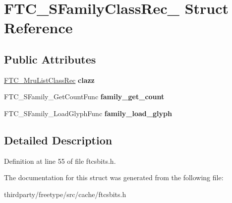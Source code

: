 \hypertarget{struct_f_t_c___s_family_class_rec__}{}\section{F\+T\+C\+\_\+\+S\+Family\+Class\+Rec\+\_\+ Struct Reference}
\label{struct_f_t_c___s_family_class_rec__}
\subsection*{Public Attributes}
\begin{DoxyCompactItemize}
\item 
\mbox{\label{struct_f_t_c___s_family_class_rec___af7d295d715e5f9f3b547be44f0e3f90b}} 
\hyperlink{struct_f_t_c___mru_list_class_rec__}{F\+T\+C\+\_\+\+Mru\+List\+Class\+Rec} {\bfseries clazz}
\item 
\mbox{\label{struct_f_t_c___s_family_class_rec___a57fc1e09cc711845085cb92c1d501906}} 
F\+T\+C\+\_\+\+S\+Family\+\_\+\+Get\+Count\+Func {\bfseries family\+\_\+get\+\_\+count}
\item 
\mbox{\label{struct_f_t_c___s_family_class_rec___a98a017fde579be6a9cbf27c8e1febf34}} 
F\+T\+C\+\_\+\+S\+Family\+\_\+\+Load\+Glyph\+Func {\bfseries family\+\_\+load\+\_\+glyph}
\end{DoxyCompactItemize}


\subsection{Detailed Description}


Definition at line 55 of file ftcsbits.\+h.



The documentation for this struct was generated from the following file\+:\begin{DoxyCompactItemize}
\item 
thirdparty/freetype/src/cache/ftcsbits.\+h\end{DoxyCompactItemize}
